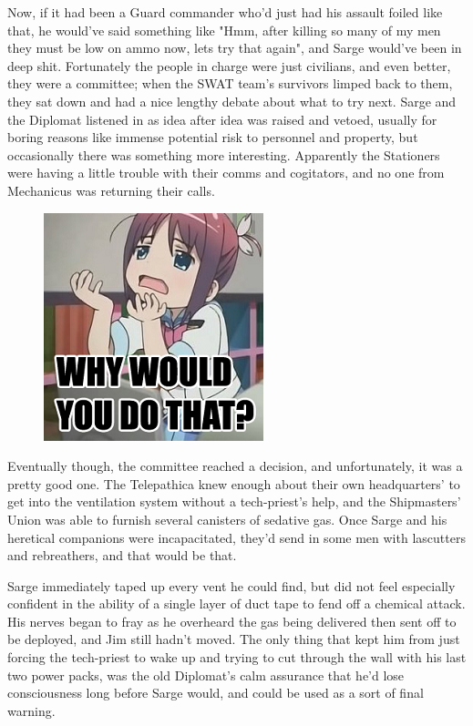 Now, if it had been a Guard commander who'd just had his assault foiled like that, he would've said something like "Hmm, after killing so many of my men they must be low on ammo now, lets try that again", and Sarge would've been in deep shit. 
Fortunately the people in charge were just civilians, and even better, they were a committee; 
when the SWAT team's survivors limped back to them, they sat down and had a nice lengthy debate about what to try next. 
Sarge and the Diplomat listened in as idea after idea was raised and vetoed, usually for boring reasons like immense potential risk to personnel and property, but occasionally there was something more interesting. 
Apparently the Stationers were having a little trouble with their comms and cogitators, and no one from Mechanicus was returning their calls.

\begin{figure}
	\begin{center}
		\includegraphics[width=\figwidth]{pics/14/40.png}
	\end{center}
\end{figure}
Eventually though, the committee reached a decision, and unfortunately, it was a pretty good one. 
The Telepathica knew enough about their own headquarters' to get into the ventilation system without a tech-priest's help, and the Shipmasters' Union was able to furnish several canisters of sedative gas. 
Once Sarge and his heretical companions were incapacitated, they'd send in some men with lascutters and rebreathers, and that would be that.

Sarge immediately taped up every vent he could find, but did not feel especially confident in the ability of a single layer of duct tape to fend off a chemical attack. 
His nerves began to fray as he overheard the gas being delivered then sent off to be deployed, and Jim still hadn't moved. 
The only thing that kept him from just forcing the tech-priest to wake up and trying to cut through the wall with his last two power packs, was the old Diplomat's calm assurance that he'd lose consciousness long before Sarge would, and could be used as a sort of final warning. 


